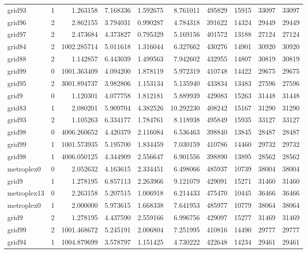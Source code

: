 \begin{longtable}{|l|r|r|r|r|r|r|r|r|r|}
grid93 & 1 & 1.263158 & 7.168336 & 1.592675 & 8.761011 & 495829 & 15915 & 33097 & 33097 \\
grid96 & 2 & 2.862155 & 3.794031 & 0.990287 & 4.784318 & 391622 & 14324 & 29449 & 29449 \\
grid97 & 2 & 2.473684 & 4.373827 & 0.795329 & 5.169156 & 401572 & 13188 & 27124 & 27124 \\
grid84 & 2 & 1002.285714 & 5.011618 & 1.316044 & 6.327662 & 430276 & 14901 & 30920 & 30920 \\
grid88 & 2 & 1.142857 & 6.443039 & 1.499563 & 7.942602 & 432955 & 14807 & 30819 & 30819 \\
grid99 & 0 & 1001.363409 & 4.094200 & 1.878119 & 5.972319 & 410748 & 14422 & 29675 & 29675 \\
grid95 & 2 & 3001.894737 & 3.982806 & 1.153134 & 5.135940 & 433834 & 13483 & 27596 & 27596 \\
grid9 & 0 & 1.120301 & 4.077758 & 1.812181 & 5.889939 & 429083 & 15263 & 31448 & 31448 \\
grid83 & 1 & 2.080201 & 5.909704 & 4.382526 & 10.292230 & 408242 & 15167 & 31290 & 31290 \\
grid93 & 2 & 1.105263 & 6.334177 & 1.784761 & 8.118938 & 495849 & 15935 & 33127 & 33127 \\
grid98 & 0 & 4006.260652 & 4.420379 & 2.116084 & 6.536463 & 398840 & 13845 & 28487 & 28487 \\
grid99 & 1 & 1001.573935 & 5.195700 & 1.834459 & 7.030159 & 410786 & 14460 & 29732 & 29732 \\
grid98 & 1 & 4006.050125 & 4.344909 & 2.556647 & 6.901556 & 398890 & 13895 & 28562 & 28562 \\
metroplex0 & 0 & 2.052632 & 4.163615 & 2.334451 & 6.498066 & 485937 & 10739 & 38004 & 38004 \\
grid9 & 1 & 1.278195 & 6.857113 & 2.263966 & 9.121079 & 429091 & 15271 & 31460 & 31460 \\
metroplex13 & 0 & 2.263158 & 5.207515 & 1.006918 & 6.214433 & 475470 & 10445 & 36466 & 36466 \\
metroplex0 & 1 & 2.000000 & 5.973615 & 1.668338 & 7.641953 & 485977 & 10779 & 38064 & 38064 \\
grid9 & 2 & 1.278195 & 4.437590 & 2.559166 & 6.996756 & 429097 & 15277 & 31469 & 31469 \\
grid99 & 2 & 1001.468672 & 5.245191 & 2.006804 & 7.251995 & 410816 & 14490 & 29777 & 29777 \\
grid94 & 1 & 1004.879699 & 3.578797 & 1.151425 & 4.730222 & 422648 & 14234 & 29461 & 29461 \\

\end{longtable}
